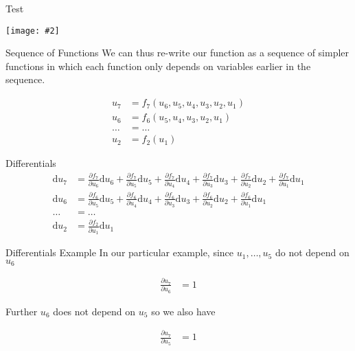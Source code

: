 \documentclass{beamer}
\newcommand {\framedgraphic}[2] {
    \begin{frame}{#1}
        \begin{center}
            \texttt{[image: \#2]}
        \end{center}
    \end{frame}
}
\begin{document}
\framedgraphic{Test}{diagrams/02c0671aa558b88e5ed6f195b22bbd8a.png}

\begin{frame}[fragile]{Sequence of Functions}
We can thus re-write our function as a sequence of simpler functions
in which each function only depends on variables earlier in the
sequence.

$$
\begin{aligned}
u_7    &= f_7(u_6, u_5, u_4, u_3, u_2, u_1) \\
u_6    &= f_6(u_5, u_4, u_3, u_2, u_1) \\
\ldots &= \ldots \\
u_2    &= f_2(u_1)
\end{aligned}
$$
\end{frame}

\begin{frame}[fragile]{Differentials}
$$
\begin{aligned}
\mathrm{d}u_7    &= \frac{\partial f_7}{\partial u_6} \mathrm{d} u_6 +
                    \frac{\partial f_7}{\partial u_5} \mathrm{d} u_5 +
                    \frac{\partial f_7}{\partial u_4} \mathrm{d} u_4 +
                    \frac{\partial f_7}{\partial u_3} \mathrm{d} u_3 +
                    \frac{\partial f_7}{\partial u_2} \mathrm{d} u_2 +
                    \frac{\partial f_7}{\partial u_1} \mathrm{d} u_1 \\
\mathrm{d}u_6    &= \frac{\partial f_6}{\partial u_5} \mathrm{d} u_5 +
                    \frac{\partial f_6}{\partial u_4} \mathrm{d} u_4 +
                    \frac{\partial f_6}{\partial u_3} \mathrm{d} u_3 +
                    \frac{\partial f_6}{\partial u_2} \mathrm{d} u_2 +
                    \frac{\partial f_6}{\partial u_1} \mathrm{d} u_1 \\
\ldots           &= \ldots \\
\mathrm{d}u_2    &= \frac{\partial f_2}{\partial u_1} \mathrm{d} u_1
\end{aligned}
$$
\end{frame}

\begin{frame}[fragile]{Differentials Example}
In our particular example, since $u_1, \dots, u_5$ do not depend on $u_6$

$$
\begin{aligned}
\frac{\partial u_7}{\partial u_6} &= 1
\end{aligned}
$$

Further $u_6$ does not depend on $u_5$ so we also have

$$
\begin{aligned}
\frac{\partial u_7}{\partial u_5} &= 1 \\
\end{aligned}
$$
\end{frame}
\end{document}
